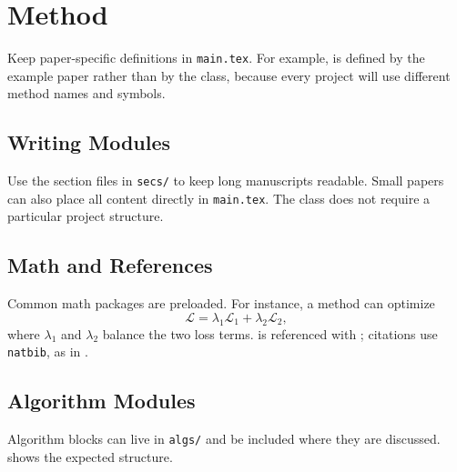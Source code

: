 \section{Method}

Keep paper-specific definitions in \texttt{main.tex}. For example,
\texttt{\string\method} is defined by the example paper rather than by the
class, because every project will use different method names and symbols.

\subsection{Writing Modules}

Use the section files in \texttt{secs/} to keep long manuscripts readable.
Small papers can also place all content directly in \texttt{main.tex}. The class
does not require a particular project structure.

\subsection{Math and References}

Common math packages are preloaded. For instance, a method can optimize
\begin{equation}
  \mathcal{L} = \lambda_1 \mathcal{L}_{\mathrm{1}}
    + \lambda_2 \mathcal{L}_{\mathrm{2}},
  \label{eq:loss}
\end{equation}
where \(\lambda_1\) and \(\lambda_2\) balance the two loss terms.
 is referenced with \texttt{\string\eqnref}; citations use
\texttt{natbib}, as in \cite{lamport1994latex,mittelbach2004latex}.

\subsection{Algorithm Modules}

Algorithm blocks can live in \texttt{algs/} and be included where they are
discussed.  shows the expected structure.


